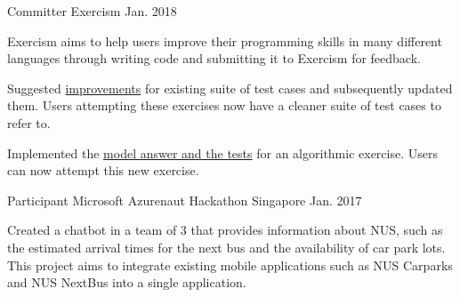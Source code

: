 

\begin{cventries}


  \cventry
    {Committer} %
    {Exercism} %
    {} %
    {Jan. 2018} %
    {
      \begin{cvitems} %
        \item {Exercism aims to help users improve their programming skills in many different languages through writing code and submitting it to Exercism for feedback.}
        \item {Suggested \href{https://github.com/issues?utf8=\%E2\%9C\%93&q=repo\%3Aexercism\%2Fproblem-specifications+involves\%3AZhiyuan-Amos}{improvements} for existing suite of test cases and subsequently updated them. Users attempting these exercises now have a cleaner suite of test cases to refer to.}
        \item {Implemented the \href{https://github.com/issues?utf8=\%E2\%9C\%93&q=repo\%3Aexercism\%2Fjava+involves\%3AZhiyuan-Amos}{model answer and the tests} for an algorithmic exercise. Users can now attempt this new exercise.}
      \end{cvitems}
    }

  \cventry
    {Participant} %
    {Microsoft Azurenaut Hackathon} %
    {Singapore} %
    {Jan. 2017} %
    {
      \begin{cvitems} %
        \item {Created a chatbot in a team of 3 that provides information about NUS, such as the estimated arrival times for the next bus and the availability of car park lots. This project aims to integrate existing mobile applications such as NUS Carparks and NUS NextBus into a single application.}
      \end{cvitems}
    }
    

\end{cventries}
